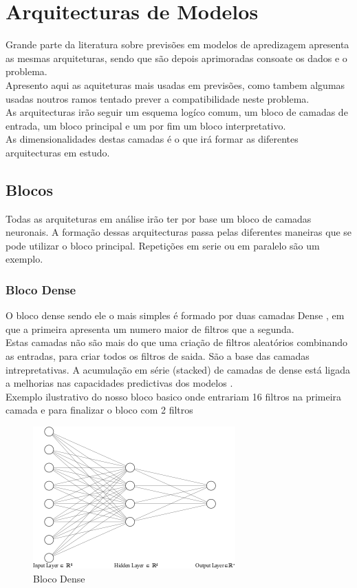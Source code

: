 \chapter{Arquitecturas de Modelos\label{ch:arquiteturas_modelos}}

Grande parte da literatura sobre previsões em modelos de apredizagem apresenta as mesmas arquiteturas, sendo que são depois aprimoradas consoate os dados e o problema. \\
Apresento aqui as aquiteturas mais usadas em previsões, como tambem algumas usadas noutros ramos tentado prever a compatibilidade neste problema. \\
As arquitecturas irão seguir um esquema logíco comum, um bloco de camadas de entrada, um bloco principal e um por fim um bloco interpretativo. \\
As dimensionalidades destas camadas é o que irá formar as diferentes arquitecturas em estudo. \\

\section{Blocos\label{se:blocos}}

Todas as arquiteturas em análise irão ter por base um bloco de camadas neuronais. A formação dessas arquitecturas passa pelas diferentes maneiras que se pode utilizar o bloco principal. Repetições em serie ou em paralelo são um exemplo. \\

\subsection{Bloco Dense\label{se:dense}}

O bloco dense sendo ele o mais simples é formado por duas camadas Dense \cite{}, em que a primeira apresenta um numero maior de filtros que a segunda. \\
Estas camadas não são mais do que uma criação de filtros aleatórios combinando as entradas, para criar todos os filtros de saida. São a base das camadas intrepretativas. A acumulação em série (stacked) de camadas de dense está ligada a melhorias nas capacidades predictivas dos modelos \cite{VLHelen2021}. \\
Exemplo ilustrativo do nosso bloco basico onde entrariam 16 filtros na primeira camada e para finalizar o bloco com 2 filtros \\

\begin{figure}[H]
	\centering
	\includegraphics{Imagens/dense_layer.png}
	\caption{Bloco Dense}
	\label{fig:dense_blcok}
\end{figure}
	
